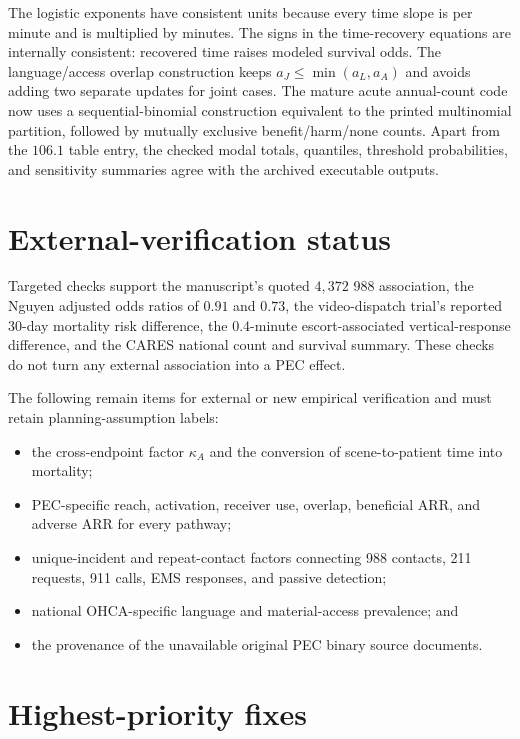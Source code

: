 \documentclass[11pt]{article}
\begin{document}
The logistic exponents have consistent units because every time slope is per
minute and is multiplied by minutes.  The signs in the time-recovery equations
are internally consistent: recovered time raises modeled survival odds.  The
language/access overlap construction keeps $a_J\leq\min(a_L,a_A)$ and avoids
adding two separate updates for joint cases.  The mature acute annual-count
code now uses a sequential-binomial construction equivalent to the printed
multinomial partition, followed by mutually exclusive benefit/harm/none
counts.  Apart from the $106.1$ table entry, the checked modal totals,
quantiles, threshold probabilities, and sensitivity summaries agree with the
archived executable outputs.

\section*{External-verification status}

Targeted checks support the manuscript's quoted $4{,}372$ 988 association, the
Nguyen adjusted odds ratios of $0.91$ and $0.73$, the video-dispatch trial's
reported 30-day mortality risk difference, the $0.4$-minute escort-associated
vertical-response difference, and the CARES national count and survival
summary.  These checks do not turn any external association into a PEC effect.

The following remain items for external or new empirical verification and
must retain planning-assumption labels:
\begin{itemize}
\item the cross-endpoint factor $\kappa_A$ and the conversion of
scene-to-patient time into mortality;
\item PEC-specific reach, activation, receiver use, overlap, beneficial ARR,
and adverse ARR for every pathway;
\item unique-incident and repeat-contact factors connecting 988 contacts, 211
requests, 911 calls, EMS responses, and passive detection;
\item national OHCA-specific language and material-access prevalence; and
\item the provenance of the unavailable original PEC binary source documents.
\end{itemize}

\section*{Highest-priority fixes}
\end{document}
